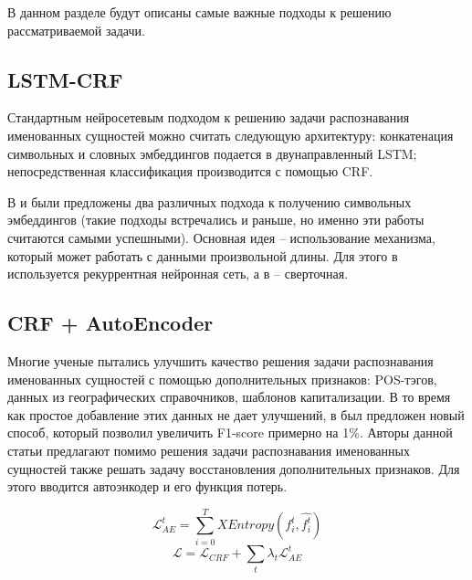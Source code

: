 \documentclass[a4paper,14pt]{extarticle}
\begin{document}
В данном разделе будут описаны самые важные подходы к решению рассматриваемой задачи.

\subsection{LSTM-CRF}

Стандартным нейросетевым подходом к решению задачи распознавания именованных сущностей можно считать следующую архитектуру: конкатенация символьных и словных эмбеддингов подается в двунаправленный LSTM; непосредственная классификация производится с помощью CRF.

В \cite{1603.01360} и \cite{1603.01354} были предложены два различных подхода к получению символьных эмбеддингов (такие подходы встречались и раньше, но именно эти работы считаются самыми успешными). Основная идея -- использование механизма, который может работать с данными произвольной длины. Для этого в \cite{1603.01360} используется рекуррентная нейронная сеть, а в \cite{1603.01354} -- сверточная.



\clearpage

\subsection{CRF + AutoEncoder}

Многие ученые пытались улучшить качество решения задачи распознавания именованных сущностей с помощью дополнительных признаков: POS-тэгов, данных из географических справочников, шаблонов капитализации. В то время как простое добавление этих данных не дает улучшений, в \cite{1808.09075} был предложен новый способ, который позволил увеличить F1-score примерно на 1\%. Авторы данной статьи предлагают помимо решения задачи распознавания именованных сущностей также решать задачу восстановления дополнительных признаков. Для этого вводится автоэнкодер и его функция потерь.

$$\mathcal{L}_{AE}^{t} = \sum_{i=0}^{T}{XEntropy(f_{i}^{t},\hat{f_{i}^{t}})}$$
$$\mathcal{L} = \mathcal{L}_{CRF} + \sum_{t}{\lambda_{t}\mathcal{L}_{AE}^{t}}$$

\end{document}
